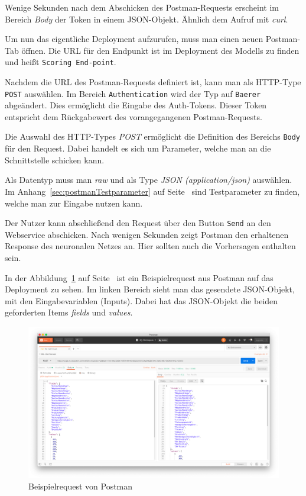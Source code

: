 Wenige Sekunden nach dem Abschicken des Postman-Requests erscheint im Bereich \textit{Body} der Token in einem
JSON-Objekt. Ähnlich dem Aufruf mit \textit{curl}.

Um nun das eigentliche Deployment aufzurufen, muss man einen neuen Postman-Tab öffnen. Die URL für den Endpunkt ist im
Deployment des Modells zu finden und heißt \texttt{Scoring End-point}.

Nachdem die URL des Postman-Requests definiert ist, kann man als HTTP-Type \texttt{POST} auswählen. Im Bereich
\texttt{Authentication} wird der Typ auf \texttt{Baerer} abgeändert. Dies ermöglicht die Eingabe des Auth-Tokens. Dieser
Token entspricht dem Rückgabewert des vorangegangenen Postman-Requests.

Die Auswahl des HTTP-Types \textit{POST} ermöglicht die Definition des Bereichs \texttt{Body} für den Request. Dabei
handelt es sich um Parameter, welche man an die Schnittstelle schicken kann.

Als Datentyp muss man \textit{raw} und als Type \textit{JSON (application/json)} auswählen. Im
Anhang~\ref{sec:postmanTestparameter} auf Seite~\pageref{sec:postmanTestparameter} sind Testparameter zu finden, welche
man zur Eingabe nutzen kann.

Der Nutzer kann abschließend den Request über den Button \texttt{Send} an den Webservice abschicken. Nach wenigen
Sekunden zeigt Postman den erhaltenen Response des neuronalen Netzes an. Hier sollten auch die Vorhersagen enthalten
sein.

In der Abbildung~\ref{fig:umsetzung_deployment_postman} auf Seite~\pageref{fig:umsetzung_deployment_postman} ist ein
Beispielrequest aus Postman auf das Deployment zu sehen. Im linken Bereich sieht man das gesendete JSON-Objekt, mit den
Eingabevariablen (Inputs). Dabei hat das JSON-Objekt die beiden geforderten Items \textit{fields} und \textit{values}.

\begin{figure}[h]
    \centering
    \includegraphics[width=\textwidth]{images/kapitel_3/deployment_postman.png}
    \caption{Beispielrequest von Postman}
    \label{fig:umsetzung_deployment_postman}
\end{figure}

